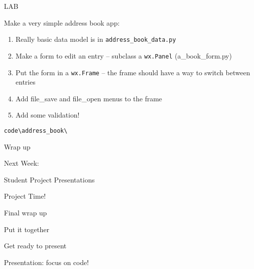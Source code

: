 \documentclass{beamer}
\begin{document}
\begin{frame}[fragile]{LAB}

\vfill
{\Large Make a very simple address book app:}

\begin{enumerate}
 \item Really basic data model is in \verb`address_book_data.py`
 \item Make a form to edit an entry -- subclass a \verb`wx.Panel` (a_book_form.py)
 \item Put the form in a \verb`wx.Frame` -- the frame should have a way to switch between entries
 \item Add file_save and file_open menus to the frame
 \item Add some validation!
\end{enumerate}




\verb`code\address_book\`

\end{frame}


\begin{frame}[fragile]{Wrap up}

\vfill
{\Large }
\vfill

\end{frame}

\begin{frame}{Next Week:}

\vfill
{\LARGE Student Project Presentations}

\vfill

\end{frame}

\begin{frame}[fragile]{Project Time!}

\vfill
\Large{Final wrap up}

\vfill
\Large{Put it together}

\vfill
\Large{Get ready to present}

\vfill
\Large{Presentation: focus on code!}

\end{frame}
\end{document}

